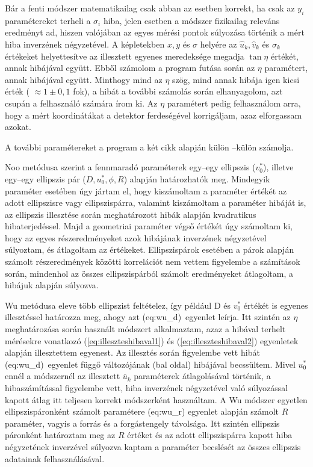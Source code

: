 \documentclass[a4paper,12pt]{article}
\begin{document}
Bár a fenti módszer matematikailag csak abban az esetben korrekt, ha  csak az  $y_i$ paramétereket terheli a $\sigma_i$ hiba, jelen esetben  a módszer fizikailag releváns eredményt ad, hiszen valójában az egyes mérési pontok súlyozása történik a mért hiba inverzének négyzetével. A képletekben $x,y$ és $\sigma$ helyére az $\hat{u}_k, \hat{v}_k$ és $\hat{\sigma}_k$ értékeket helyettesítve az illesztett egyenes meredeksége megadja $\tan \eta$ értékét, annak hibájával együtt. Ebből számolom a program futása során az $\eta$ paramétert, annak hibájával együtt. Minthogy mind az $\eta$ szög, mind annak hibája igen kicsi érték ( $\approx 1\pm 0\!,1$ fok), a hibát a további számolás során elhanyagolom, azt csupán a felhasználó számára írom ki. Az $\eta$ paramétert pedig felhasználom arra, hogy a mért koordinátákat a detektor ferdeségével korrigáljam, azaz elforgassam azokat.


A további paramétereket a program a két cikk alapján külön --külön számolja. 

Noo metódusa szerint a fennmaradó paraméterek egy--egy ellipszis ($v_0^*$), illetve egy--egy ellipszis pár ($D, u_0^*, \phi, R$) alapján határozhatók meg.  Mindegyik paraméter esetében úgy jártam el, hogy kiszámoltam a paraméter értékét az adott ellipszisre vagy ellipszispárra, valamint kiszámoltam a paraméter hibáját is, az ellipszis illesztése során meghatározott hibák alapján kvadratikus hibaterjedéssel. Majd a geometriai paraméter végső értékét úgy számoltam ki, hogy az egyes részeredményeket azok hibájának inverzének négyzetével súlyoztam, és átlagoltam az értékeket. Ellipszispárok esetében a párok alapján számolt részeredmények közötti korrelációt nem vettem figyelembe a számítások során, mindenhol az összes ellipszispárból számolt eredményeket átlagoltam, a hibájuk alapján súlyozva.

Wu metódusa eleve több ellipszist feltételez, így például D és $v_0^*$ értékét is egyenes illesztéssel határozza meg, ahogy azt \aref({eq:wu_d})~egyenlet leírja. Itt szintén az $\eta$ meghatározása során használt módszert alkalmaztam, azaz a hibával terhelt mérésekre vonatkozó (\ref{eq:illeszteshibaval1}) és (\ref{eq:illeszteshibaval2}) egyenletek alapján illesztettem egyenest. Az illesztés során figyelembe vett hibát \aref({eq:wu_d})~egyenlet függő változójának (bal oldal) hibájával becssültem.  Mivel $u_0^*$ ennél a módszernél az illesztett $\overline{u}_k$ paraméterek átlagolásával történik, a hibaszámítással figyelembe vett, hiba inverzének négyzetével való súlyozással kapott átlag itt teljesen korrekt módszerként használtam. A Wu módszer egyetlen ellipszispáronként számolt paramétere  \Aref({eq:wu_r}) egyenlet alapján számolt $R$ paraméter, vagyis a forrás és a forgástengely távolsága. Itt szintén ellipszis páronként határoztam meg az $R$ értéket és az adott ellipszispárra kapott hiba négyzetének inverzével súlyozva  kaptam a paraméter becslését az összes ellipszis adatainak felhasználásával. 
\end{document}
